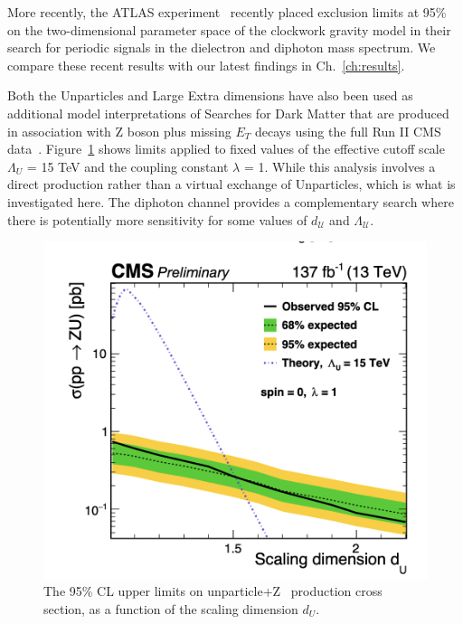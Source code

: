 More recently, the ATLAS experiment~\cite{ATLAS:2023hbp} recently placed exclusion limits at 95\% on the two-dimensional parameter space of the clockwork gravity model in their search for periodic signals in the dielectron and diphoton mass spectrum. We compare these recent results with our latest findings in Ch.~\ref{ch:results}.


Both the Unparticles and Large Extra dimensions have also been used as additional model interpretations of Searches for Dark Matter that are produced in association with Z boson plus missing $E_{T}$ decays using the full Run II CMS data~\cite{CMS:2020ulv}. Figure~\ref{fig:UnparZMET} shows limits applied to fixed values of the effective cutoff scale $\Lambda_U$ = 15 TeV and the coupling constant $\lambda$ = 1. While this analysis involves a direct production rather than a virtual exchange of Unparticles, which is what is investigated here. The diphoton channel provides a complementary search where there is potentially more sensitivity for some values of $d_{\mathcal{U}}$ and $\Lambda_{\mathcal{U}}$.

\begin{figure}[ht]
    \centering
    \includegraphics[scale=0.7]{fig/Unparticles.png}
    \caption{The 95\% CL upper limits on unparticle+Z~\cite{CMS:2020ulv} production cross section, as a function of the scaling dimension $d_U$.}
    \label{fig:UnparZMET}
\end{figure}

